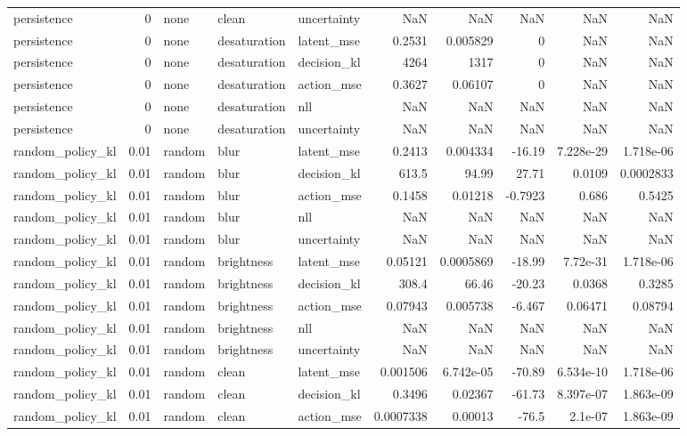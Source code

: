 \begin{tabular}{lrlllrrrrr}
persistence & 0 & none & clean & uncertainty & NaN & NaN & NaN & NaN & NaN \\
persistence & 0 & none & desaturation & latent\_mse & 0.2531 & 0.005829 & 0 & NaN & NaN \\
persistence & 0 & none & desaturation & decision\_kl & 4264 & 1317 & 0 & NaN & NaN \\
persistence & 0 & none & desaturation & action\_mse & 0.3627 & 0.06107 & 0 & NaN & NaN \\
persistence & 0 & none & desaturation & nll & NaN & NaN & NaN & NaN & NaN \\
persistence & 0 & none & desaturation & uncertainty & NaN & NaN & NaN & NaN & NaN \\
random\_policy\_kl & 0.01 & random & blur & latent\_mse & 0.2413 & 0.004334 & -16.19 & 7.228e-29 & 1.718e-06 \\
random\_policy\_kl & 0.01 & random & blur & decision\_kl & 613.5 & 94.99 & 27.71 & 0.0109 & 0.0002833 \\
random\_policy\_kl & 0.01 & random & blur & action\_mse & 0.1458 & 0.01218 & -0.7923 & 0.686 & 0.5425 \\
random\_policy\_kl & 0.01 & random & blur & nll & NaN & NaN & NaN & NaN & NaN \\
random\_policy\_kl & 0.01 & random & blur & uncertainty & NaN & NaN & NaN & NaN & NaN \\
random\_policy\_kl & 0.01 & random & brightness & latent\_mse & 0.05121 & 0.0005869 & -18.99 & 7.72e-31 & 1.718e-06 \\
random\_policy\_kl & 0.01 & random & brightness & decision\_kl & 308.4 & 66.46 & -20.23 & 0.0368 & 0.3285 \\
random\_policy\_kl & 0.01 & random & brightness & action\_mse & 0.07943 & 0.005738 & -6.467 & 0.06471 & 0.08794 \\
random\_policy\_kl & 0.01 & random & brightness & nll & NaN & NaN & NaN & NaN & NaN \\
random\_policy\_kl & 0.01 & random & brightness & uncertainty & NaN & NaN & NaN & NaN & NaN \\
random\_policy\_kl & 0.01 & random & clean & latent\_mse & 0.001506 & 6.742e-05 & -70.89 & 6.534e-10 & 1.718e-06 \\
random\_policy\_kl & 0.01 & random & clean & decision\_kl & 0.3496 & 0.02367 & -61.73 & 8.397e-07 & 1.863e-09 \\
random\_policy\_kl & 0.01 & random & clean & action\_mse & 0.0007338 & 0.00013 & -76.5 & 2.1e-07 & 1.863e-09 \\

\end{tabular}
